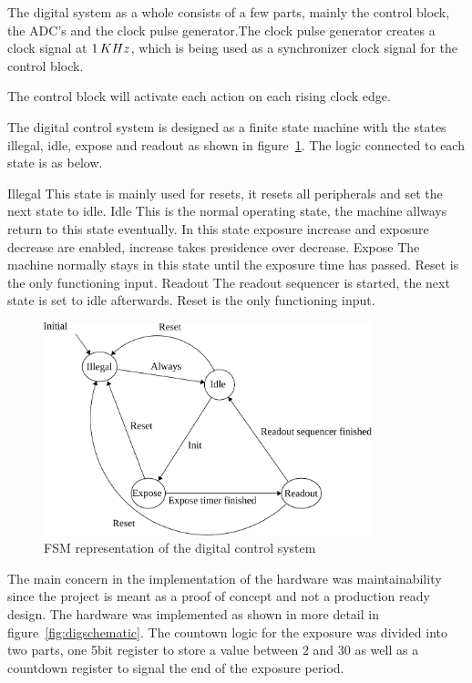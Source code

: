 The digital system as a whole consists of a few parts, mainly the control block, the ADC's and the clock pulse generator.The clock pulse generator creates a clock signal at $1 \mskip3mu KHz$, which is being used as a synchronizer clock signal for the control block.

The control block will activate each action on each rising clock edge. 

The digital control system is designed as a finite state machine with the states illegal, idle, expose and readout as shown in figure~\ref{fig:fsmDiagram}.
The logic connected to each state is as below.

\begin{outline}
  \1 Illegal
  \2 This state is mainly used for resets, it resets all peripherals and set the next state to idle.
  \1 Idle
  \2 This is the normal operating state, the machine allways return to this state eventually.
  \2 In this state exposure increase and exposure decrease are enabled, increase takes presidence over decrease.
  \1 Expose
  \2 The machine normally stays in this state until the exposure time has passed.
  \2 Reset is the only functioning input.
  \1 Readout
  \2 The readout sequencer is started, the next state is set to idle afterwards.
  \2 Reset is the only functioning input.
\end{outline}

\begin{figure}[htbp]
  \centering
  \includegraphics[width=0.85\textwidth]{figures/fsmDiagram}
  \caption{FSM representation of the digital control system}
  \label{fig:fsmDiagram}
\end{figure}

The main concern in the implementation of the hardware was maintainability since the project is meant as a proof of concept and not a production ready design.
The hardware was implemented as shown in more detail in figure~\ref{fig:digschematic}.
The countown logic for the exposure was divided into two parts, one 5bit register to store a value between 2 and 30 as well as a countdown register
to signal the end of the exposure period.

